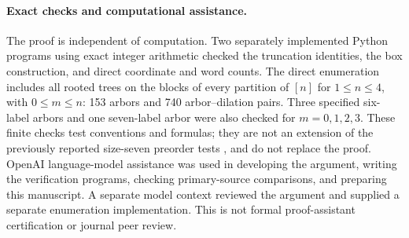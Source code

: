 \documentclass[11pt]{article}
\begin{document}
\paragraph{Exact checks and computational assistance.}
The proof is independent of computation. Two separately implemented
Python programs using exact integer arithmetic checked the truncation
identities, the box construction, and direct coordinate and word counts.
The direct enumeration includes all rooted trees on the blocks of every
partition of $[n]$ for $1\leq n\leq4$, with $0\leq m\leq n$:
153 arbors and 740 arbor--dilation pairs. Three specified six-label arbors
and one seven-label arbor were also checked for $m=0,1,2,3$.
These finite checks test conventions and formulas; they are not an
extension of the previously reported size-seven preorder tests
\cite[Section~4.3]{AC}, and do not replace the proof.
OpenAI language-model assistance was used in developing the argument,
writing the verification programs, checking primary-source comparisons,
and preparing this manuscript. A separate model context reviewed the
argument and supplied a separate enumeration implementation. This is not
formal proof-assistant certification or journal peer review.



\raggedright

\end{document}
